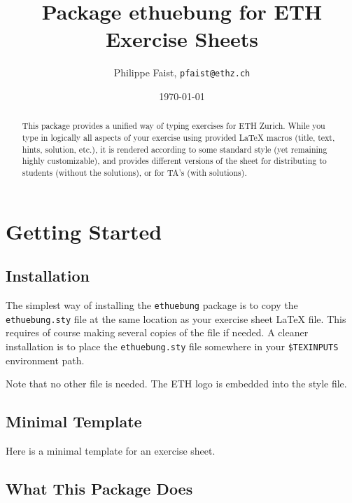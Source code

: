 \documentclass[11pt,a4paper]{article}
\title{Package {\fontseries{m}\selectfont ethuebung} for ETH Exercise Sheets}
\author{Philippe Faist, \texttt{pfaist@ethz.ch}}
\date\today
\begin{document}
\maketitle

\renewcommand{\abstractname}{}
\setlength{\noteabstracttextwidth}{0.95\textwidth}
\renewcommand{\noteabstracttextfont}{\small}
\begin{abstract}
This package provides a unified way of typing exercises for ETH Zurich. While you type in
logically all aspects of your exercise using provided \LaTeX{} macros (title, text, hints,
solution, etc.), it is rendered according to some standard style (yet remaining highly
customizable), and provides different versions of the sheet for distributing to students
(without the solutions), or for TA's (with solutions).
\end{abstract}

{\small
\inlinetoc
}

\section{Getting Started}

\subsection{Installation}

The simplest way of installing the \texttt{ethuebung} package is to copy the
\texttt{ethuebung.sty} file at the same location as your exercise sheet \LaTeX{} file. This
requires of course making several copies of the file if needed.
A cleaner installation is to place the \texttt{ethuebung.sty} file somewhere in your
\texttt{\$TEXINPUTS} environment path.

Note that no other file is needed. The ETH logo is embedded into the style file.


\subsection{Minimal Template}
\label{sec:minimaltemplate}

Here is a minimal template for an exercise sheet.

\begin{pkgverbatim}%
%
\end{pkgverbatim}


\subsection{What This Package Does}
\end{document}
